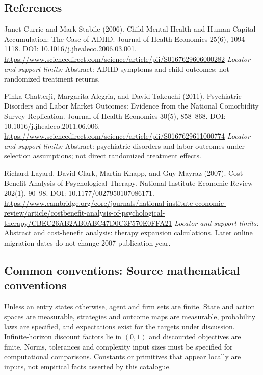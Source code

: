 \documentclass[11pt,a4paper]{article}
\begin{document}
\subsection*{References}
\begin{enumerate}[label={[S\arabic*]},leftmargin=*,itemsep=0.6em]
\item Janet Currie and Mark Stabile (2006). Child Mental Health and Human Capital Accumulation: The Case of ADHD. Journal of Health Economics 25(6), 1094--1118. DOI: 10.1016/j.jhealeco.2006.03.001.
\url{https://www.sciencedirect.com/science/article/pii/S0167629606000282}
\newline\emph{Locator and support limits:} Abstract: ADHD symptoms and child outcomes; not randomized treatment returns.
\item Pinka Chatterji, Margarita Alegria, and David Takeuchi (2011). Psychiatric Disorders and Labor Market Outcomes: Evidence from the National Comorbidity Survey-Replication. Journal of Health Economics 30(5), 858--868. DOI: 10.1016/j.jhealeco.2011.06.006.
\url{https://www.sciencedirect.com/science/article/pii/S0167629611000774}
\newline\emph{Locator and support limits:} Abstract: psychiatric disorders and labor outcomes under selection assumptions; not direct randomized treatment effects.
\item Richard Layard, David Clark, Martin Knapp, and Guy Mayraz (2007). Cost-Benefit Analysis of Psychological Therapy. National Institute Economic Review 202(1), 90--98. DOI: 10.1177/0027950107086171.
\url{https://www.cambridge.org/core/journals/national-institute-economic-review/article/costbenefit-analysis-of-psychological-therapy/CBEC26AB2AB0ABC47D0C3F570E0FFA21}
\newline\emph{Locator and support limits:} Abstract and cost-benefit analysis: therapy expansion calculations. Later online migration dates do not change 2007 publication year.
\end{enumerate}

\subsection*{Common conventions: Source mathematical conventions}

Unless an entry states otherwise, agent and firm sets are finite. State and action spaces are measurable, strategies and outcome maps are measurable, probability laws are specified, and expectations exist for the targets under discussion. Infinite-horizon discount factors lie in $(0,1)$ and discounted objectives are finite. Norms, tolerances and complexity input sizes must be specified for computational comparisons. Constants or primitives that appear locally are inputs, not empirical facts asserted by this catalogue.
\end{document}

